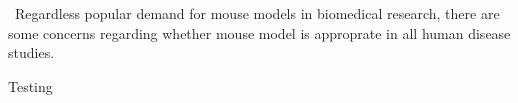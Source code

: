 \ Regardless popular demand for mouse models in biomedical research, there are some concerns regarding whether mouse model is approprate in all human disease studies. 

Testing